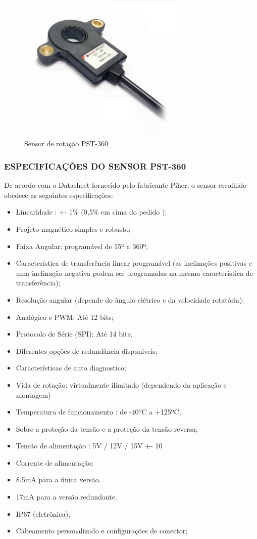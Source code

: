 \begin{figure}[h]
  \centering
  \includegraphics[width=300px, scale=1]{figuras/pst}
  \caption{ Sensor de rotação PST-360}
\label{fig:pst}
\end{figure}

\subsubsection{ESPECIFICAÇÕES DO SENSOR PST-360}

De acordo com o Datasheet \cite{sensor_rotacao} fornecido pelo fabricante Piher, o sensor escolhido
obedece as seguintes especificações:

\begin{itemize}
  \item Linearidade : +- 1\% (0,5\% em cima do pedido );
  \item Projeto magnético simples e robusto;
  \item Faixa Angular: programável de 15º a 360º;
  \item Característica de transferência linear programável (as inclinações positivas e
  uma inclinação negativa podem ser programadas na mesma característica de transferência);

  \item Resolução angular (depende do ângulo elétrico e da velocidade rotatória):
  \item Analógico e PWM: Até 12 bits;
  \item Protocolo de Série (SPI): Até 14 bits;
  \item Diferentes opções de redundância disponíveis;
  \item Características de auto diagnostico;
  \item Vida de rotação: virtualmente ilimitado (dependendo da aplicação e montagem)
  \item Temperatura de funcionamento : de -40ºC a +125ºC;
  \item Sobre a proteção da tensão e a proteção da tensão reversa;
  \item Tensão de alimentação : 5V / 12V / 15V +- 10%
  \item Corrente de alimentação:
  \item 8.5mA para a única versão.
  \item 17mA para a versão redundante.
  \item IP67 (eletrônica);
  \item Cabeamento personalizado e configurações de conector;
\end{itemize}

